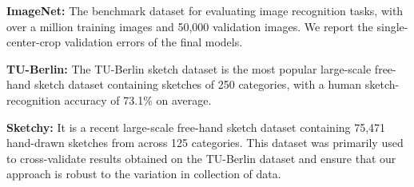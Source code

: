 \documentclass[10pt,twocolumn,letterpaper]{article}
\begin{document}
{\bf ImageNet:} The benchmark dataset for evaluating image recognition tasks, with over a million training images and 50,000 validation images. We report the single-center-crop validation errors of the final models.

{\bf TU-Berlin:} The TU-Berlin \cite{eitz2012hdhso} sketch dataset is the most popular large-scale free-hand sketch dataset containing sketches of 250 categories, with a human sketch-recognition accuracy of 73.1\% on average. 

{\bf Sketchy:} It is a recent large-scale free-hand sketch dataset containing 75,471 hand-drawn sketches from across 125 categories. This dataset was primarily used to cross-validate results obtained on the TU-Berlin dataset and ensure that our approach is robust to the variation in collection of data.


\begin{table}[t]
\begin{center}
\end{center}
\vspace{-0.4cm}
\caption{
A detailed comparison of accuracy, memory use, FLOPs with popular benchmark compression techniques on ImageNet. Our hybrid models outperform other 1-bit activation models and perform on par with 2-bit models while having a significantly higher speedup. Hybrid-2 models have the last layer binarized.}
\label{table:imagenet_fullcomp}
\end{table}
\end{document}
